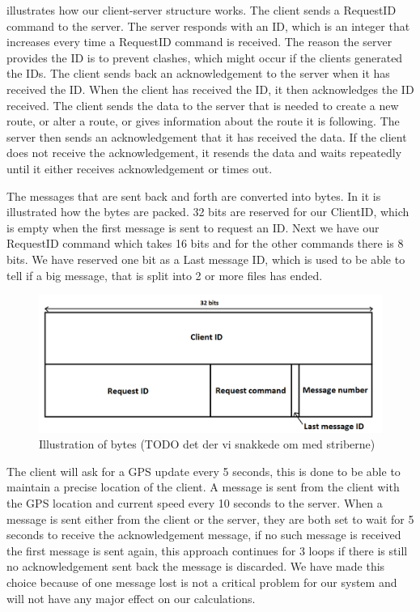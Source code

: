  illustrates how our client-server structure works.
The client sends a RequestID command to the server.
The server responds with an ID, which is an integer that increases every time a RequestID command is received.
The reason the server provides the ID is to prevent clashes, which might occur if the clients generated the IDs.
The client sends back an acknowledgement to the server when it has received the ID.
When the client has received the ID, it then acknowledges the ID received.
The client sends the data to the server that is needed to create a new route,
or alter a route, or gives information about the route it is following.
The server then sends an acknowledgement that it has received the data.
If the client does not receive the acknowledgement,
it resends the data and waits repeatedly until it either receives acknowledgement or times out. 

The messages that are sent back and forth are converted into bytes.
In  it is illustrated how the bytes are packed.
32 bits are reserved for our ClientID, which is empty when the first message is sent to request an ID.
Next we have our RequestID command which takes 16 bits and for the other commands there is 8 bits.
We have reserved one bit as a Last message ID, which is used to be able to tell if a big message,
that is split into 2 or more files has ended.

\begin{figure}[h!]
  \centering
    \includegraphics[width=1\textwidth]{figures/bytesclientserver.png}
    \caption{Illustration of bytes (TODO det der vi snakkede om med striberne)}
    \label{fig:bytesclientserver}
\end{figure}

The client will ask for a GPS update every 5 seconds, this is done to be able to maintain a precise location of the client. A message is sent from the client with the GPS location and current speed every 10 seconds to the server.
When a message is sent either from the client or the server,
they are both set to wait for 5 seconds to receive the acknowledgement message,
if no such message is received the first message is sent again,
this approach continues for 3 loops if there is still no acknowledgement sent back the message is discarded.
We have made this choice because of one message lost is not a critical problem for our system and will not have any major effect on our calculations.		
